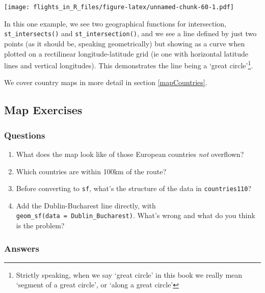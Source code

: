 \documentclass[
]{book}
\providecommand{\tightlist}{%
  \setlength{\itemsep}{0pt}\setlength{\parskip}{0pt}}
\begin{document}
\texttt{[image: flights\_in\_R\_files/figure-latex/unnamed-chunk-60-1.pdf]}

In this one example, we see two geographical functions for intersection, \texttt{st\_intersects()} and \texttt{st\_intersection()}, and we see a line defined by just two points (as it should be, speaking geometrically) but showing as a curve when plotted on a rectilinear longitude-latitude grid (ie one with horizontal latitude lines and vertical longitudes). This demonstrates the line being a `great circle'\footnote{Strictly speaking, when we say `great circle' in this book we really mean `segment of a great circle', or `along a great circle'}.

We cover country maps in more detail in section \ref{mapCountries}.

\hypertarget{map-exercises}{%
\subsection{Map Exercises}\label{map-exercises}}

\hypertarget{questions-8}{%
\subsubsection{Questions}\label{questions-8}}

\begin{enumerate}
\def\labelenumi{\arabic{enumi})}
\tightlist
\item
  What does the map look like of those European countries \emph{not} overflown?
\item
  Which countries are within 100km of the route?
\item
  Before converting to \texttt{sf}, what's the structure of the data in \texttt{countries110}?
\item
  Add the Dublin-Bucharest line directly, with \texttt{geom\_sf(data\ =\ Dublin\_Bucharest)}. What's wrong and what do you think is the problem?
\end{enumerate}

\hypertarget{answers-8}{%
\subsubsection{Answers}\label{answers-8}}
\end{document}

